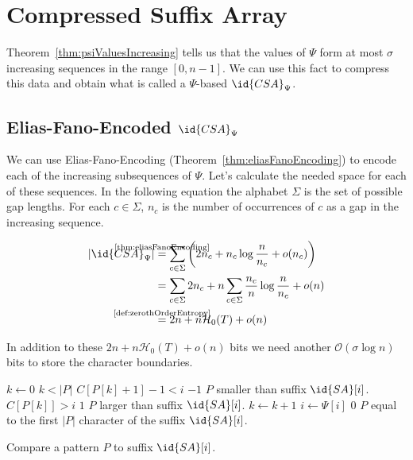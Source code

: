 \section{Compressed Suffix Array}

Theorem~\ref{thm:psiValuesIncreasing} tells us that the values of $\Psi$ form at most $\sigma$ increasing sequences in the range $[0,n-1]$. We can use this fact to compress this data and obtain what is called a $\Psi$-based  $\id{CSA}_\Psi$.

\subsection{Elias-Fano-Encoded $\id{CSA}_\Psi$}

We can use Elias-Fano-Encoding (Theorem~\ref{thm:eliasFanoEncoding}) to encode each of the increasing subsequences of $\Psi$. Let's calculate the needed space for each of these sequences. In the following equation the alphabet $\Sigma$ is the set of possible gap lengths. For each $c \in \Sigma$, $n_c$ is the number of occurrences of $c$ as a gap in the increasing sequence.

\begin{align}
  \begin{aligned}
    \vert \id{CSA}_\Psi \vert
    &\stackrel{\mathclap{\text{\ref{thm:eliasFanoEncoding}}}}{=}
    \sum_{c \in \Sigma} \left(2n_c + n_c\log\frac{n}{n_c} + o(n_c)\right) \\
    &= \sum_{c \in \Sigma} 2n_c + n\sum_{c \in \Sigma}\frac{n_c}{n}\log\frac{n}{n_c} + o(n) \\
    &\stackrel{\mathclap{\text{\ref{def:zerothOrderEntropy}}}}{=} 2n + n\mathcal{H}_0(T) + o(n)
  \end{aligned}
\end{align}

In addition to these $2n + n\mathcal{H}_0(T) + o(n)$ bits we need another $\mathcal{O}(\sigma\log n)$ bits to store the character boundaries.

\begin{algorithm}[htb]
  \begin{codebox}
    \li $k \gets 0$
    \li \While $k < \vert P \vert$
        \Do
    \li   \If $C[P[k] + 1] - 1 < i$
          \label{line:compareCSACheckSmaller}
          \Then
    \li     \Return $-1$ \>\>\>\>\Comment $P$ smaller than suffix $\id{SA}[i]$.
    \li   \ElseIf $C[P[k]] > i$
          \label{line:compareCSACheckBigger}
          \Then
    \li     \Return $1$ \>\>\>\>\Comment $P$ larger than suffix $\id{SA}[i]$.
          \End
    \li   $k \gets k + 1$
    \li   $i \gets \Psi[i]$
        \End
    \li \Return $0$ \>\>\>\>\>\>\Comment $P$ equal to the first $\vert P \vert$ character of the suffix $\id{SA}[i]$.
  \end{codebox}
  \caption{Compare a pattern $P$ to suffix $\id{SA}[i]$.}
  \label{alg:compareCompressedSuffixArrayPsi}
\end{algorithm}

